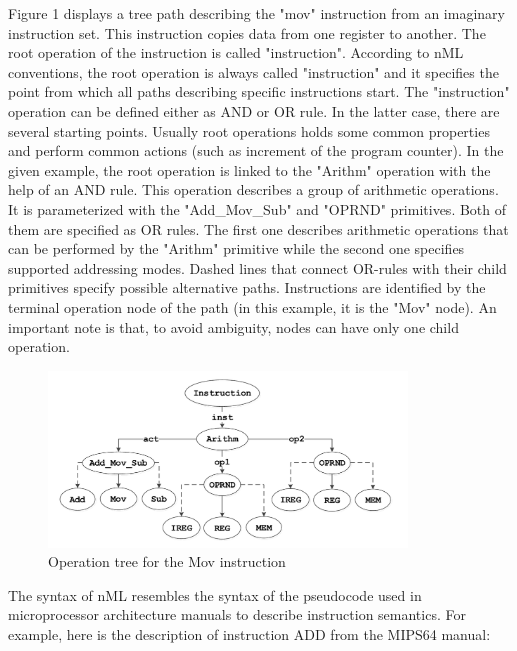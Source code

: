 \documentclass[oneside,final,14pt]{extreport}
\begin{document}
Figure 1 displays a tree path describing the "mov" instruction from an
imaginary instruction set. This instruction copies data from one register to
another. The root operation of the instruction is called "instruction".
According to nML conventions, the root operation is always called "instruction"
and it specifies the point from which all paths describing specific
instructions start. The "instruction" operation can be defined either as AND or
OR rule. In the latter case, there are several starting points. Usually root
operations holds some common properties and perform common actions (such as
increment of the program counter). In the given example, the root operation is
linked to the "Arithm" operation with the help of an AND rule. This operation
describes a group of arithmetic operations. It is parameterized with the
"Add{\_}Mov{\_}Sub" and "OPRND" primitives. Both of them are specified as OR rules.
The first one describes arithmetic operations that can be performed by the
"Arithm" primitive while the second one specifies supported addressing modes.
Dashed lines that connect OR-rules with their child primitives specify possible
alternative paths. Instructions are identified by the terminal operation node of
the path (in this example, it is the "Mov" node). An important note is that, to
avoid ambiguity, nodes can have only one child operation.

\begin{figure}
\centering
\includegraphics [width=0.85\textwidth]
{figures/figure1.pdf}
\caption{Operation tree for the Mov instruction}
\label{nml-instruction-tree}
\end{figure}

The syntax of nML resembles the syntax of the pseudocode used in microprocessor
architecture manuals to describe instruction semantics. For example, here is the
description of instruction ADD from the MIPS64 manual:

\end{document}
